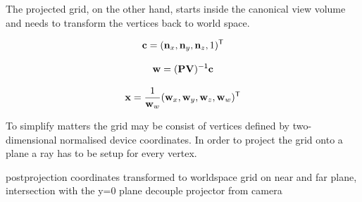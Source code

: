The projected grid, on the other hand, starts inside the canonical view volume
and needs to transform the vertices back to world space.

\begin{equation}
\label{eq:ndc_to_cs}
 \mathbf{c} = (\mathbf{n}_x, \mathbf{n}_y, \mathbf{n}_z, 1)^\mathsf{T}
\end{equation}

\begin{equation}
\label{eq:cs_to_wsh}
 \mathbf{w} = (\mathbf{P} \mathbf{V})^\mathsf{-1} \mathbf{c}
\end{equation}

\begin{equation}
\label{eq:wsh_to_ws}
 \mathbf{x} = \frac{1}{\mathbf{w}_w}(\mathbf{w}_x, \mathbf{w}_y, \mathbf{w}_z, \mathbf{w}_w)^\mathsf{T}
\end{equation}

To simplify matters the grid may be consist of vertices defined by
two-dimensional normalised device coordinates. In order to project the grid
onto a plane a ray has to be setup for every vertex.

postprojection coordinates transformed to worldspace
grid on near and far plane, intersection with the y=0 plane
decouple projector from camera
